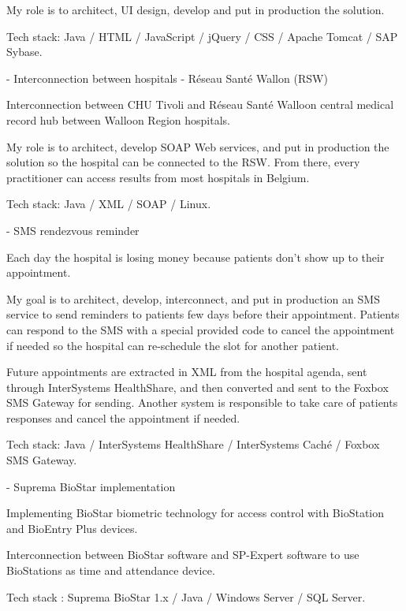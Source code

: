 \begin{cventries}
{My role is to architect, UI design, develop and put in production the solution.

Tech stack: Java / HTML / JavaScript / jQuery / CSS / Apache Tomcat / SAP Sybase.

    }
    
    
   
  \cventry
    {-} %
    {Interconnection between hospitals - Réseau Santé Wallon (RSW)} %
    {} %
    {} %
    {
Interconnection between CHU Tivoli and Réseau Santé Walloon central medical record hub between Walloon Region hospitals.

My role is to architect, develop SOAP Web services, and put in production the solution so the hospital can be connected to the RSW. From there, every practitioner can access results from most hospitals in Belgium.

Tech stack: Java / XML / SOAP / Linux.

    }
    
    
   
  \cventry
    {-} %
    {SMS rendezvous reminder} %
    {} %
    {} %
    {
Each day the hospital is losing money because patients don't show up to their appointment.

My goal is to architect, develop, interconnect, and put in production an SMS service to send reminders to patients few days before their appointment. Patients can respond to the SMS with a special provided code to cancel the appointment if needed so the hospital can re-schedule the slot for another patient.

Future appointments are extracted in XML from the hospital agenda, sent through InterSystems HealthShare, and then converted and sent to the Foxbox SMS Gateway for sending. Another system is responsible to take care of patients responses and cancel the appointment if needed. 

Tech stack: Java / InterSystems HealthShare / InterSystems Caché / Foxbox SMS Gateway.

    }
    
    
 
  \cventry
    {-} %
    {Suprema BioStar implementation} %
    {} %
    {} %
    {
Implementing BioStar biometric technology for access control with BioStation and BioEntry Plus devices.

Interconnection between BioStar software and SP-Expert software to use BioStations as time and attendance device. 

Tech stack : Suprema BioStar 1.x / Java / Windows Server / SQL Server.
    }

\end{cventries}
